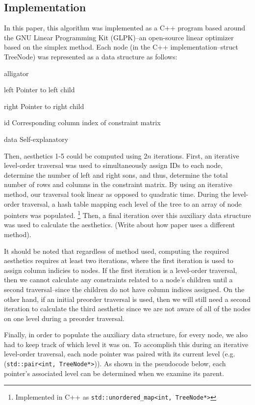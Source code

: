 \documentclass[11pt]{report}
\begin{document}
\subsection{Implementation}
In this paper, this algorithm was implemented as a C++ program based around the GNU Linear Programming Kit (GLPK)--an open-source linear optimizer based on the simplex method. Each node (in the C++ implementation--struct TreeNode) was represented as a data structure as follows:

\begin{labeling}{alligator}
    \item [left]  Pointer to left child
    \item [right] Pointer to right child
    \item [id]    Corresponding column index of constraint matrix
    \item [data]  Self-explanatory
\end{labeling}

Then, aesthetics 1-5 could be computed using $2n$ iterations. First, an iterative level-order traversal was used to simultaneously assign IDs to each node, determine the number of left and right sons, and thus, determine the total number of rows and columns in the constraint matrix. By using an iterative method, our traversal took linear as opposed to quadratic time. During the level-order traversal, a hash table mapping each level of the tree to an array of node pointers was populated.
\footnote{Implemented in C++ as \lstinline{std::unordered_map<int, TreeNode*>}}
Then, a final iteration over this auxiliary data structure was used to calculate the aesthetics. (Write about how paper uses a different method).

\bigskip

It should be noted that regardless of method used, computing the required aesthetics requires at least two iterations, where the first iteration is used to assign column indicies to nodes. If the first iteration is a level-order traversal, then we cannot calculate any constraints related to a node's children until a second traversal--since the children do not have column indices assigned. On the other hand, if an initial preorder traversal is used, then we will still need a second iteration to calculate the third aesthetic since we are not aware of all of the nodes on one level during a preorder traversal.

\bigskip

Finally, in order to populate the auxiliary data structure, for every node, we also had to keep track of which level it was on. To accomplish this during an iterative level-order traversal, each node pointer was paired with its current level (e.g. (\lstinline{std::pair<int, TreeNode*>})). As shown in the pseudocode below, each pointer's associated level can be determined when we examine its parent.
\end{document}
